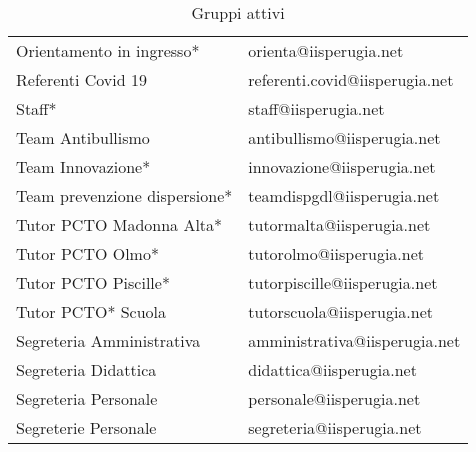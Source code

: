 \begin{table}
\begin{tabular}{ll}
Orientamento in ingresso*&
orienta@iisperugia.net\\
Referenti Covid 19&
referenti.covid@iisperugia.net\\
Staff*&
staff@iisperugia.net\\
Team Antibullismo &
antibullismo@iisperugia.net\\
Team Innovazione*&
innovazione@iisperugia.net\\
Team prevenzione dispersione*&
teamdispgdl@iisperugia.net\\
Tutor PCTO Madonna Alta*&
tutormalta@iisperugia.net\\
Tutor PCTO Olmo*&
tutorolmo@iisperugia.net\\
Tutor PCTO Piscille* &
tutorpiscille@iisperugia.net\\
Tutor PCTO* Scuola&
tutorscuola@iisperugia.net\\
Segreteria Amministrativa&amministrativa@iisperugia.net	\\
Segreteria Didattica&didattica@iisperugia.net	\\
Segreteria Personale&personale@iisperugia.net	\\
Segreterie Personale&segreteria@iisperugia.net	\\
\midrule
\end{tabular}
\caption{Gruppi attivi}
\label{tab:GruppiAttivi}
\end{table}
